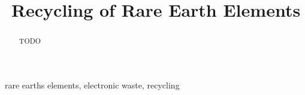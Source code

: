 \documentclass[conference]{IEEEtran}
\begin{document}
\title{Recycling of Rare Earth Elements}

\author{
}

\maketitle

\begin{abstract}
TODO
\end{abstract}

\begin{IEEEkeywords}
rare earths elements, electronic waste, recycling
\end{IEEEkeywords}














\end{document}
